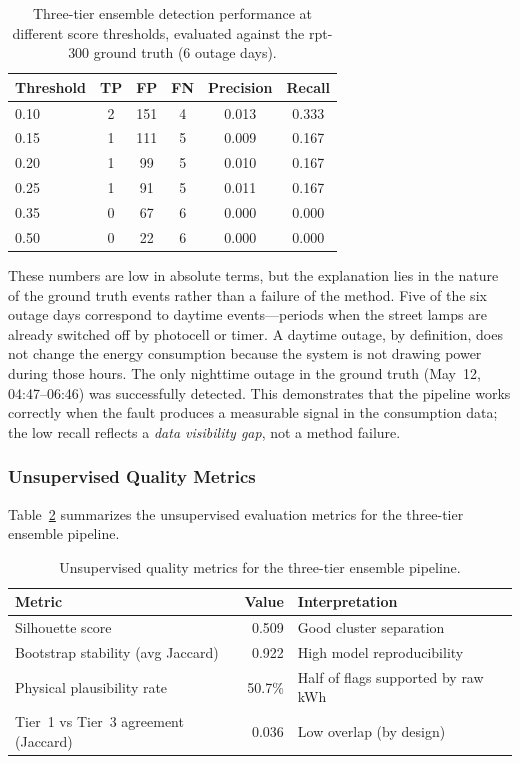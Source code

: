\documentclass{article}
\begin{document}
\begin{table}[H]
\centering
\caption{Three-tier ensemble detection performance at different score thresholds, evaluated against the rpt-300 ground truth (6 outage days).}
\label{tab:ensemble_threshold}
\begin{tabular}{lccccc}
\toprule
\textbf{Threshold} & \textbf{TP} & \textbf{FP} & \textbf{FN} & \textbf{Precision} & \textbf{Recall} \\
\midrule
0.10 & 2 & 151 & 4 & 0.013 & 0.333 \\
0.15 & 1 & 111 & 5 & 0.009 & 0.167 \\
0.20 & 1 &  99 & 5 & 0.010 & 0.167 \\
0.25 & 1 &  91 & 5 & 0.011 & 0.167 \\
0.35 & 0 &  67 & 6 & 0.000 & 0.000 \\
0.50 & 0 &  22 & 6 & 0.000 & 0.000 \\
\bottomrule
\end{tabular}
\end{table}

These numbers are low in absolute terms, but the explanation lies in the nature of the ground truth events rather than a failure of the method. Five of the six outage days correspond to daytime events---periods when the street lamps are already switched off by photocell or timer. A daytime outage, by definition, does not change the energy consumption because the system is not drawing power during those hours. The only nighttime outage in the ground truth (May~12, 04:47--06:46) was successfully detected. This demonstrates that the pipeline works correctly when the fault produces a measurable signal in the consumption data; the low recall reflects a \emph{data visibility gap}, not a method failure.

\subsubsection{Unsupervised Quality Metrics}

Table~\ref{tab:ensemble_quality} summarizes the unsupervised evaluation metrics for the three-tier ensemble pipeline.

\begin{table}[H]
\centering
\caption{Unsupervised quality metrics for the three-tier ensemble pipeline.}
\label{tab:ensemble_quality}
\begin{tabular}{lrl}
\toprule
\textbf{Metric} & \textbf{Value} & \textbf{Interpretation} \\
\midrule
Silhouette score          & 0.509  & Good cluster separation \\
Bootstrap stability (avg Jaccard) & 0.922  & High model reproducibility \\
Physical plausibility rate & 50.7\% & Half of flags supported by raw kWh \\
Tier~1 vs Tier~3 agreement (Jaccard) & 0.036 & Low overlap (by design) \\
\bottomrule
\end{tabular}
\end{table}
\end{document}
